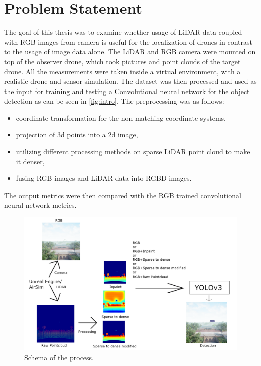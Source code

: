 \documentclass[twoside]{ctuthesis}
\theoremstyle{plain}
\theoremstyle{definition}
\theoremstyle{note}
\begin{document}
\section{Problem Statement}
The goal of this thesis was to examine whether usage of LiDAR data coupled with RGB images from camera is useful for the localization of drones in contrast to the usage of image data alone. The LiDAR and RGB camera were mounted on top of the observer drone, which took pictures and point clouds of the target drone. All the measurements were taken inside a virtual environment, with a realistic drone and sensor simulation. The dataset was then processed and used as the input for training and testing a Convolutional neural network for the object detection as can be seen in \autoref{fig:intro}. The preprocessing was as follows:
\begin{itemize}
	\item coordinate transformation for the non-matching coordinate systems,
	\item projection of 3d points into a 2d image,
	\item utilizing different processing methods on sparse LiDAR point cloud to make it denser,
	\item fusing RGB images and LiDAR data into RGBD images.
\end{itemize}
The output metrics were then compared with the RGB trained convolutional neural network metrics.
\begin{figure}
	\centering
	\includegraphics[width=\textwidth]{intro_schemav2.png}
	\caption{Schema of the process.}
	\label{fig:intro}
\end{figure}
\end{document}
